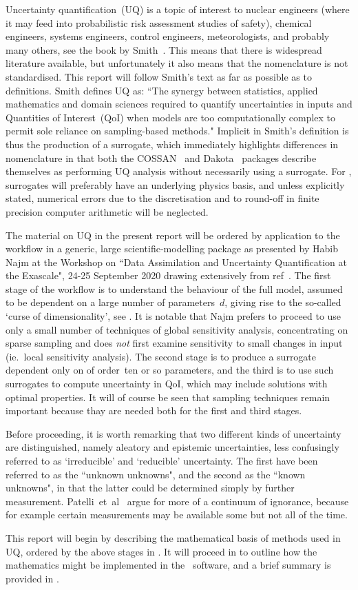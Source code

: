 Uncertainty quantification~(UQ)
is a topic of interest to nuclear engineers (where it may
feed into probabilistic risk assessment studies of safety), chemical engineers,
systems engineers, control engineers, meteorologists, and probably many others,
see the book by Smith~\cite{smithUQ}.
This means that there is widespread literature available, but
unfortunately it also means that the nomenclature is not standardised.
This report will follow Smith's text as far as possible as to definitions.
Smith defines UQ as: ``The synergy between statistics, applied mathematics
and domain sciences required to quantify uncertainties in inputs and
Quantities of Interest~(QoI) when models are too computationally complex to
permit sole reliance on sampling-based methods." Implicit in Smith's definition
is thus the  production of a surrogate, which immediately highlights differences
in nomenclature in that both the COSSAN~\cite{Pa14Open} and Dakota~\cite{dakota6} packages describe
themselves as performing UQ analysis without necessarily using a surrogate.
For \nep,  surrogates will preferably have an underlying physics basis,
and unless explicitly stated, numerical errors due to the discretisation and to round-off
in finite precision computer arithmetic will be neglected.

The material on UQ in the present report will be ordered by application to the
workflow in a generic, large scientific-modelling package as presented by Habib Najm
at the Workshop on ``Data Assimilation and Uncertainty Quantification at
the Exascale", 24-25 September 2020 drawing extensively from ref~\cite{Hu18Glob}.
The first stage of the workflow is to understand the behaviour of the full model,
assumed to be dependent on a large number of parameters~$d$, giving 
rise to the so-called  `curse of dimensionality', see .
It is notable that Najm prefers to proceed to
use only a small number of techniques of global sensitivity analysis,
concentrating on sparse sampling and does \emph{not} first
examine sensitivity to small changes in input (ie.\ local sensitivity analysis).
The second stage is to produce a surrogate dependent only on of order~ten or so
parameters, and the third is to use such surrogates to compute uncertainty in QoI,
which may include solutions with optimal properties.
It will of course be seen that sampling techniques remain important because thay are needed
both for the first and third stages.

Before proceeding, it is worth remarking that two different kinds of uncertainty
are distinguished, namely aleatory and epistemic uncertainties, less confusingly
referred to as `irreducible' and `reducible' uncertainty.
The first have been referred to as the ``unknown unknowns", and the second as the
``known unknowns", in that the latter could be determined simply by further measurement.
Patelli~et~al~\cite{Pa14Open} argue for more of a continuum of ignorance, because for example
certain measurements may be available some but not all of the time.

This report will begin by describing the mathematical basis of methods used in UQ, ordered
by the above stages in .
It will proceed in  to outline how the mathematics might be implemented in the
\nep\ software, and a brief summary is provided in .

